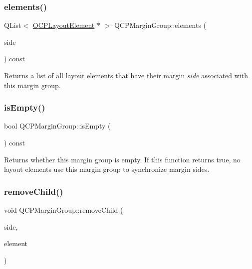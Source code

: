 \mbox{\label{class_q_c_p_margin_group_ac967a4dc5fe02ae44aeb43511d5e1bd4}} 
\subsubsection{\texorpdfstring{elements()}{elements()}}
{\footnotesize\ttfamily Q\+List$<$ \mbox{\hyperlink{class_q_c_p_layout_element}{Q\+C\+P\+Layout\+Element}} $\ast$ $>$ Q\+C\+P\+Margin\+Group\+::elements (\begin{DoxyParamCaption}\item[{\mbox{\hyperlink{namespace_q_c_p_a7e487e3e2ccb62ab7771065bab7cae54}{Q\+C\+P\+::\+Margin\+Side}}}]{side }\end{DoxyParamCaption}) const\hspace{0.3cm}{\ttfamily [inline]}}

Returns a list of all layout elements that have their margin {\itshape side} associated with this margin group. \mbox{\label{class_q_c_p_margin_group_ae0d32656d8a5fc5690c4e7693f9d0539}} 
\subsubsection{\texorpdfstring{isEmpty()}{isEmpty()}}
{\footnotesize\ttfamily bool Q\+C\+P\+Margin\+Group\+::is\+Empty (\begin{DoxyParamCaption}{ }\end{DoxyParamCaption}) const}

Returns whether this margin group is empty. If this function returns true, no layout elements use this margin group to synchronize margin sides. \mbox{\label{class_q_c_p_margin_group_a20ab3286062957d99b58db683fe725b0}} 
\subsubsection{\texorpdfstring{removeChild()}{removeChild()}}
{\footnotesize\ttfamily void Q\+C\+P\+Margin\+Group\+::remove\+Child (\begin{DoxyParamCaption}\item[{\mbox{\hyperlink{namespace_q_c_p_a7e487e3e2ccb62ab7771065bab7cae54}{Q\+C\+P\+::\+Margin\+Side}}}]{side,  }\item[{\mbox{\hyperlink{class_q_c_p_layout_element}{Q\+C\+P\+Layout\+Element}} $\ast$}]{element }\end{DoxyParamCaption})\hspace{0.3cm}{\ttfamily [protected]}}



